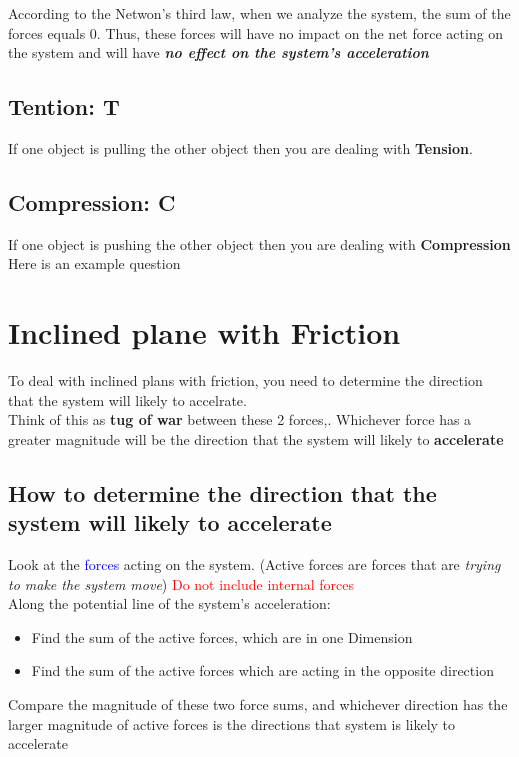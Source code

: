 According to the Netwon's third law, when we analyze the system, the sum of the forces equals 0. 
Thus, these forces will have no impact on the net force acting on the system and will have 
\textbf{\textit{no effect on the system's acceleration}}

\subsection{Tention: T}
If one object is pulling the other object then you are dealing with \textbf{Tension}.

\subsection{Compression: C}
If one object is pushing the other object then you are dealing with \textbf{Compression}
\\

Here is an example question

\newpage
\section{Inclined plane with Friction}
To deal with inclined plans with friction, you need to determine the direction that the system will likely to accelrate. 
\\

Think of this as \textbf{tug of war} between these 2 forces,. Whichever force has a greater magnitude will be the direction that the system will 
likely to \textbf{accelerate}

\subsection{How to determine the direction that the system will likely to accelerate}
Look at the \textcolor{blue}{forces} acting on the system. (Active forces are forces that are \textit{trying to make the system move})
\textcolor{red}{Do not include internal forces} \\

Along the potential line of the system's acceleration:
\begin{itemize}
    \item Find the sum of the active forces, which are in one Dimension
    \item Find the sum of the active forces which are acting in the opposite direction
\end{itemize}
Compare the magnitude of these two force sums, and whichever direction has the larger magnitude of active forces is the directions that 
system is likely to accelerate

